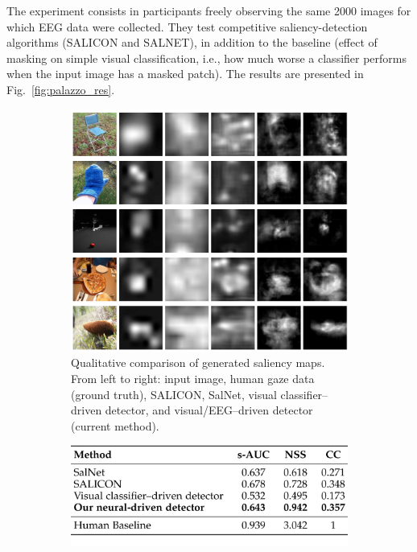 The experiment consists in participants freely observing the same 2000 images for which EEG data were collected. 
They test competitive saliency-detection algorithms (SALICON and SALNET), in addition to the baseline (effect of masking on simple visual classification, i.e., how much worse a classifier performs when the input image has a masked patch). The results are presented in Fig.~\ref{fig:palazzo_res}.

\begin{figure}[!ht]
    \centering
    \captionsetup{width=.8\linewidth}
    \begin{subfigure}{.49\textwidth}
        \centering
        \captionsetup{width=.8\linewidth}
        \includegraphics[width=.9\linewidth]{images/palazzo_3.png}
        \caption{Qualitative comparison of generated saliency maps. From left to right: input image, human gaze data (ground truth), SALICON, SalNet, visual classifier–driven detector, and visual/EEG–driven detector (current method).}
        \label{fig:palazzo_3}
    \end{subfigure}
    \begin{subfigure}{.49\textwidth}
        \centering
        \captionsetup{width=.8\linewidth}
        \includegraphics[width=.9\linewidth]{images/palazzo_4.png}

\end{subfigure}
\end{figure}
